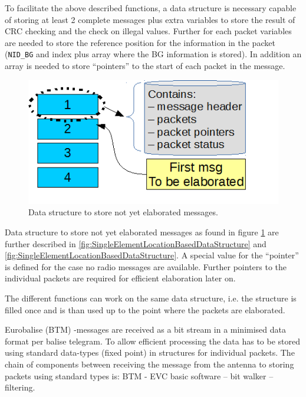 To facilitate the above described functions, a data structure is necessary capable of storing at least 2 complete messages plus extra variables to store the result of CRC checking and the check on illegal values. Further for each packet variables are needed to store the reference position for the information in the packet (\verb+NID_BG+ and index plus array where the BG information is stored). In addition an array is needed to store “pointers” to the start of each packet in the message.



\begin{figure}[ht]
\centering
\includegraphics[scale=0.6]{../images/DataStructure_NotYetElaboratedMessages.png}
\caption{Data structure to store not yet elaborated messages.}\label{fig:DataStructureTelegramStructure}
\end{figure}


Data structure to store not yet elaborated messages as found in figure \ref{fig:DataStructureTelegramStructure} are further described in \ref{fig:SingleElementLocationBasedDataStructure} and \ref{fig:SingleElementLocationBasedDataStructure}. A special value for the ``pointer'' is defined for the case no radio messages are available.
Further pointers to the individual packets are required for efficient elaboration later on. 

The different functions can work on the same data structure, i.e. the structure is filled once and is than used up to the point where the packets are elaborated.


Eurobalise (BTM) -messages are received as a bit stream in a minimised data format per balise telegram. To allow efficient processing the data has to be stored using standard data-types (fixed point) in structures for individual packets. The chain of components between receiving the message from the antenna to storing packets using standard types is:
BTM - EVC basic software – bit walker – filtering.


